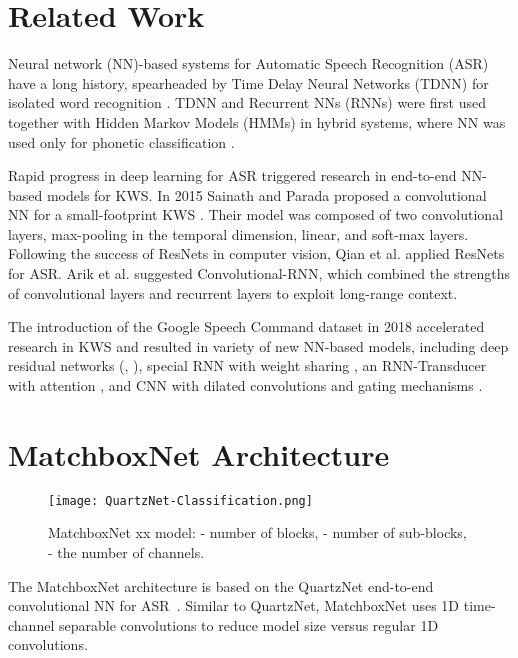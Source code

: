 \documentclass[a4paper]{article}
\begin{document}
\section{Related Work}
Neural network (NN)-based systems for Automatic Speech Recognition (ASR) have a long history, spearheaded by  Time Delay Neural Networks (TDNN) for isolated word recognition \cite{Waibel1989, lang1990}. TDNN and Recurrent NNs (RNNs) were first used together with Hidden Markov Models (HMMs) in hybrid systems, where NN was used only for phonetic classification \cite{Bengio1992, Robinson1994, Hermansky2000}. 

Rapid progress in deep learning for ASR \cite{Graves2004, Graves2005, Hinton2012} triggered research in end-to-end NN-based models for  KWS. In 2015 Sainath and Parada proposed a convolutional NN for a small-footprint KWS \cite{Sainath2015convolution}. Their model was composed of two convolutional layers, max-pooling in the temporal dimension, linear, and soft-max layers.
Following the success of ResNets \cite{he2015} in computer vision, Qian et al. \cite{qian2016very} applied ResNets for ASR. Arik et al. \cite{arik2017convolutional} suggested Convolutional-RNN, which combined the strengths of convolutional layers and recurrent layers to exploit long-range context.

The introduction of the Google Speech Command dataset \cite{warden2018speech} in 2018 accelerated research in KWS and resulted in variety of new NN-based models, including deep residual networks (\cite{Tang2018},  \cite{choi2019temporal}), special RNN with weight sharing \cite{kusupatiFastGRNN2018}, an RNN-Transducer with attention \cite{he2019streaming}, and CNN with dilated convolutions and gating mechanisms \cite{coucke2019dilatedgating}.

\section{MatchboxNet Architecture}

\begin{figure}[t]
  \centering
  \texttt{[image: QuartzNet-Classification.png]}
  \caption{MatchboxNet xx model:  - number of blocks, \quad  - number of sub-blocks,  - the number of channels.}
  \label{fig:quartznet_arch}
\end{figure}

The MatchboxNet architecture is based on the QuartzNet end-to-end  convolutional NN for ASR~\cite{kriman2019quartznet}. Similar to QuartzNet, MatchboxNet uses 1D time-channel separable convolutions to reduce model size versus regular 1D convolutions. 
\end{document}
